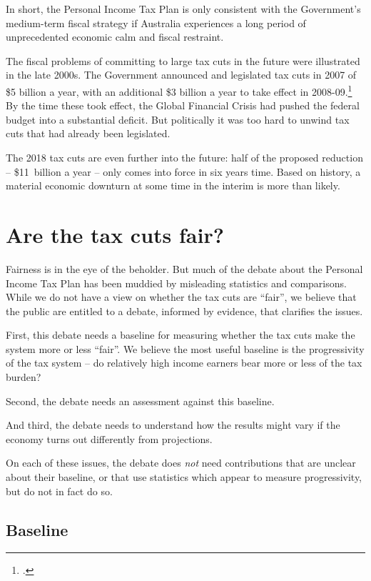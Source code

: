 \documentclass[submission]{grattan}
\begin{document}
In short, the Personal Income Tax Plan is only consistent with the Government's medium-term fiscal strategy if Australia experiences a long period of unprecedented economic calm and fiscal restraint.

The fiscal problems of committing to large tax cuts in the future were illustrated in the late 2000s. The Government announced and legislated tax cuts in 2007 of \$5 billion a year, with an additional \$3 billion a year to take effect in 2008-09.\footcite[][3]{Treasury2007}
By the time these took effect, the Global Financial Crisis had pushed the federal budget into a substantial deficit. But politically it was too hard to unwind tax cuts that had already been legislated.

The 2018 tax cuts are even further into the future: half of the proposed reduction -- \$11~billion a year -- only comes into force in six years time. Based on history, a material economic downturn at some time in the interim is more than likely.


\chapter{Are the tax cuts fair?}\label{chap:are-the-tax-cuts-fair}

Fairness is in the eye of the beholder. But much of the debate about the Personal Income Tax Plan has been muddied by misleading statistics and comparisons. While we do not have a view on whether the tax cuts are ``fair'', we believe that the public are entitled to a debate, informed by evidence, that clarifies the issues.

First, this debate needs a baseline for measuring whether the tax cuts make the system more or less ``fair''. We believe the most useful baseline is the progressivity of the tax system -- do relatively high income earners bear more or less of the tax burden?

Second, the debate needs an assessment against this baseline.

And third, the debate needs to understand how the results might vary if the economy turns out differently from projections.

On each of these issues, the debate does \emph{not} need contributions that are unclear about their baseline, or that use statistics which appear to measure progressivity, but do not in fact do so.

\section{Baseline}\label{sec:baseline}
\end{document}
